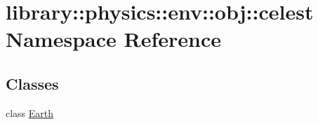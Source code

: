 \hypertarget{namespacelibrary_1_1physics_1_1env_1_1obj_1_1celest}{}\section{library\+:\+:physics\+:\+:env\+:\+:obj\+:\+:celest Namespace Reference}
\label{namespacelibrary_1_1physics_1_1env_1_1obj_1_1celest}
\subsection*{Classes}
\begin{DoxyCompactItemize}
\item 
class \hyperlink{classlibrary_1_1physics_1_1env_1_1obj_1_1celest_1_1_earth}{Earth}
\end{DoxyCompactItemize}
